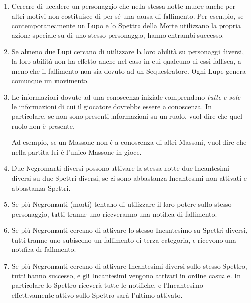 \documentclass[a4paper,10pt]{article}
\begin{document}
\begin{enumerate}
	\item Cercare di uccidere un personaggio che nella stessa notte muore anche per altri motivi non costituisce di per sé una causa di fallimento.
	Per esempio, se contemporaneamente un Lupo e lo Spettro della Morte utilizzano la propria azione speciale su di uno stesso personaggio, hanno entrambi successo.
	
	\item Se almeno due Lupi cercano di utilizzare la loro abilità su personaggi diversi, la loro abilità non ha effetto anche nel caso in cui qualcuno di essi fallisca, a meno che il fallimento non sia dovuto ad un Sequestratore. Ogni Lupo genera comunque un movimento.
	
	\item Le informazioni dovute ad una conoscenza iniziale comprendono \emph{tutte e sole} le informazioni di cui il giocatore dovrebbe essere a conoscenza. In particolare, se non sono presenti informazioni su un ruolo, vuol dire che quel ruolo non è presente.
	
	Ad esempio, se un Massone non è a conoscenza di altri Massoni, vuol dire che nella partita lui è l'unico Massone in gioco.
	
	\item Due Negromanti diversi possono attivare la stessa notte due Incantesimi diversi su due Spettri diversi, se ci sono abbastanza Incantesimi non attivati e abbastanza Spettri.
	
	\item Se più Negromanti (morti) tentano di utilizzare il loro potere sullo stesso personaggio, tutti tranne uno riceveranno una notifica di fallimento.
	
	\item Se più Negromanti cercano di attivare lo stesso Incantesimo su Spettri diversi, tutti tranne uno subiscono un fallimento di terza categoria, e ricevono una notifica di fallimento.
	
	\item Se più Negromanti cercano di attivare Incantesimi diversi sullo stesso Spettro, tutti hanno successo, e gli Incantesimi vengono attivati in ordine casuale. In particolare lo Spettro riceverà tutte le notifiche, e l'Incantesimo effettivamente attivo sullo Spettro sarà l'ultimo attivato.
	

\end{enumerate}
\end{document}
